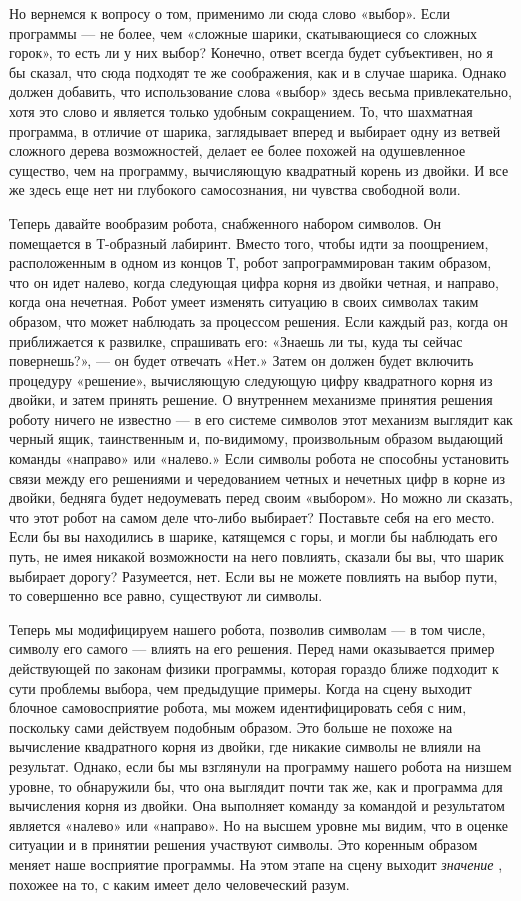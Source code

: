 \documentclass[../main.tex]{subfiles}
\begin{document}
Но вернемся к вопросу о том, применимо ли сюда слово «выбор». Если программы --- не более, чем «сложные шарики, скатывающиеся со сложных горок», то есть ли у них выбор? Конечно, ответ всегда будет субъективен, но я бы сказал, что сюда подходят те же соображения, как и в случае шарика. Однако должен добавить, что использование слова «выбор» здесь весьма привлекательно, хотя это слово и является только удобным сокращением. То, что шахматная программа, в отличие от шарика, заглядывает вперед и выбирает одну из ветвей сложного дерева возможностей, делает ее более похожей на одушевленное существо, чем на программу, вычисляющую квадратный корень из двойки. И все же здесь еще нет ни глубокого самосознания, ни чувства свободной воли.

Теперь давайте вообразим робота, снабженного набором символов. Он помещается в Т-образный лабиринт. Вместо того, чтобы идти за поощрением, расположенным в одном из концов Т, робот запрограммирован таким образом, что он идет налево, когда следующая цифра корня из двойки четная, и направо, когда она нечетная. Робот умеет изменять ситуацию в своих символах таким образом, что может наблюдать за процессом решения. Если каждый раз, когда он приближается к развилке, спрашивать его: «Знаешь ли ты, куда ты сейчас повернешь?», --- он будет отвечать «Нет.» Затем он должен будет включить процедуру «решение», вычисляющую следующую цифру квадратного корня из двойки, и затем принять решение. О внутреннем механизме принятия решения роботу ничего не известно --- в его системе символов этот механизм выглядит как черный ящик, таинственным и, по-видимому, произвольным образом выдающий команды «направо» или «налево.» Если символы робота не способны установить связи между его решениями и чередованием четных и нечетных цифр в корне из двойки, бедняга будет недоумевать перед своим «выбором». Но можно ли сказать, что этот робот на самом деле что-либо выбирает? Поставьте себя на его место. Если бы вы находились в шарике, катящемся с горы, и могли бы наблюдать его путь, не имея никакой возможности на него повлиять, сказали бы вы, что шарик выбирает дорогу? Разумеется, нет. Если вы не можете повлиять на выбор пути, то совершенно все равно, существуют ли символы.

Теперь мы модифицируем нашего робота, позволив символам --- в том числе, символу его самого --- влиять на его решения. Перед нами оказывается пример действующей по законам физики программы, которая гораздо ближе подходит к сути проблемы выбора, чем предыдущие примеры. Когда на сцену выходит блочное самовосприятие робота, мы можем идентифицировать себя с ним, поскольку сами действуем подобным образом. Это больше не похоже на вычисление квадратного корня из двойки, где никакие символы не влияли на результат. Однако, если бы мы взглянули на программу нашего робота на низшем уровне, то обнаружили бы, что она выглядит почти так же, как и программа для вычисления корня из двойки. Она выполняет команду за командой и результатом является «налево» или «направо». Но на высшем уровне мы видим, что в оценке ситуации и в принятии решения участвуют символы. Это коренным образом меняет наше восприятие программы. На этом этапе на сцену выходит \emph{значение} , похожее на то, с каким имеет дело человеческий разум.
\end{document}
